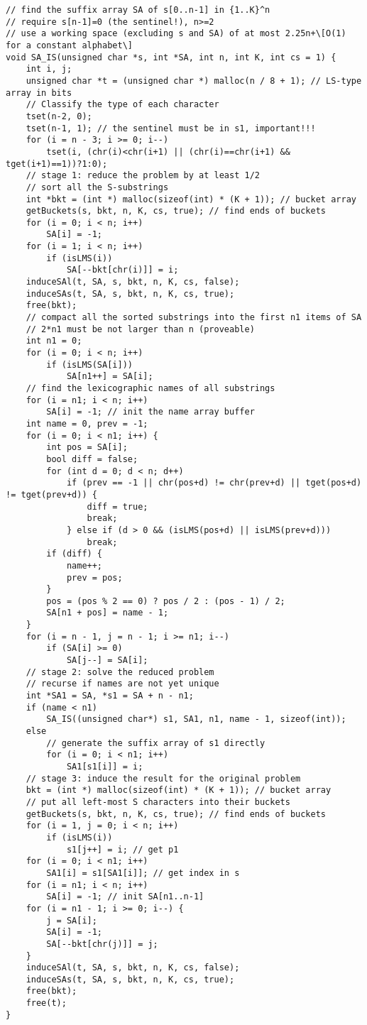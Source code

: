 \documentclass[11pt, oneside]{article}
\begin{document}
\begin{lstlisting}
// find the suffix array SA of s[0..n-1] in {1..K}^n
// require s[n-1]=0 (the sentinel!), n>=2
// use a working space (excluding s and SA) of at most 2.25n+\[O(1) for a constant alphabet\]
void SA_IS(unsigned char *s, int *SA, int n, int K, int cs = 1) {
    int i, j;
    unsigned char *t = (unsigned char *) malloc(n / 8 + 1); // LS-type array in bits
    // Classify the type of each character
    tset(n-2, 0);
    tset(n-1, 1); // the sentinel must be in s1, important!!!
    for (i = n - 3; i >= 0; i--)
        tset(i, (chr(i)<chr(i+1) || (chr(i)==chr(i+1) && tget(i+1)==1))?1:0);
    // stage 1: reduce the problem by at least 1/2
    // sort all the S-substrings
    int *bkt = (int *) malloc(sizeof(int) * (K + 1)); // bucket array
    getBuckets(s, bkt, n, K, cs, true); // find ends of buckets
    for (i = 0; i < n; i++)
        SA[i] = -1;
    for (i = 1; i < n; i++)
        if (isLMS(i))
            SA[--bkt[chr(i)]] = i;
    induceSAl(t, SA, s, bkt, n, K, cs, false);
    induceSAs(t, SA, s, bkt, n, K, cs, true);
    free(bkt);
    // compact all the sorted substrings into the first n1 items of SA
    // 2*n1 must be not larger than n (proveable)
    int n1 = 0;
    for (i = 0; i < n; i++)
        if (isLMS(SA[i]))
            SA[n1++] = SA[i];
    // find the lexicographic names of all substrings
    for (i = n1; i < n; i++)
        SA[i] = -1; // init the name array buffer
    int name = 0, prev = -1;
    for (i = 0; i < n1; i++) {
        int pos = SA[i];
        bool diff = false;
        for (int d = 0; d < n; d++)
            if (prev == -1 || chr(pos+d) != chr(prev+d) || tget(pos+d) != tget(prev+d)) {
                diff = true;
                break;
            } else if (d > 0 && (isLMS(pos+d) || isLMS(prev+d)))
                break;
        if (diff) {
            name++;
            prev = pos;
        }
        pos = (pos % 2 == 0) ? pos / 2 : (pos - 1) / 2;
        SA[n1 + pos] = name - 1;
    }
    for (i = n - 1, j = n - 1; i >= n1; i--)
        if (SA[i] >= 0)
            SA[j--] = SA[i];
    // stage 2: solve the reduced problem
    // recurse if names are not yet unique
    int *SA1 = SA, *s1 = SA + n - n1;
    if (name < n1)
        SA_IS((unsigned char*) s1, SA1, n1, name - 1, sizeof(int));
    else
        // generate the suffix array of s1 directly
        for (i = 0; i < n1; i++)
            SA1[s1[i]] = i;
    // stage 3: induce the result for the original problem
    bkt = (int *) malloc(sizeof(int) * (K + 1)); // bucket array
    // put all left-most S characters into their buckets
    getBuckets(s, bkt, n, K, cs, true); // find ends of buckets
    for (i = 1, j = 0; i < n; i++)
        if (isLMS(i))
            s1[j++] = i; // get p1
    for (i = 0; i < n1; i++)
        SA1[i] = s1[SA1[i]]; // get index in s
    for (i = n1; i < n; i++)
        SA[i] = -1; // init SA[n1..n-1]
    for (i = n1 - 1; i >= 0; i--) {
        j = SA[i];
        SA[i] = -1;
        SA[--bkt[chr(j)]] = j;
    }
    induceSAl(t, SA, s, bkt, n, K, cs, false);
    induceSAs(t, SA, s, bkt, n, K, cs, true);
    free(bkt);
    free(t);
}
\end{lstlisting}
\end{document}

